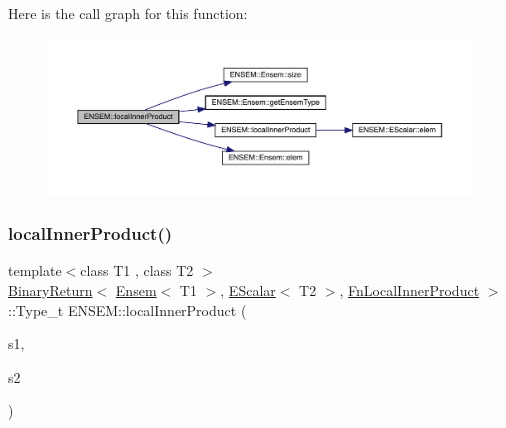 Here is the call graph for this function\+:\nopagebreak
\begin{figure}[H]
\begin{center}
\leavevmode
\includegraphics[width=350pt]{d1/d9e/group__eensem_ga5f487a5a9eb850aeb6bbd0375d54615c_cgraph}
\end{center}
\end{figure}
\mbox{\label{group__eensem_gabc088ed28b376f4b542a0fcd1337b609}} 
\subsubsection{\texorpdfstring{localInnerProduct()}{localInnerProduct()}\hspace{0.1cm}{\footnotesize\ttfamily [2/3]}}
{\footnotesize\ttfamily template$<$class T1 , class T2 $>$ \\
\mbox{\hyperlink{structENSEM_1_1BinaryReturn}{Binary\+Return}}$<$ \mbox{\hyperlink{classENSEM_1_1Ensem}{Ensem}}$<$ T1 $>$, \mbox{\hyperlink{classENSEM_1_1EScalar}{E\+Scalar}}$<$ T2 $>$, \mbox{\hyperlink{structENSEM_1_1FnLocalInnerProduct}{Fn\+Local\+Inner\+Product}} $>$\+::Type\+\_\+t E\+N\+S\+E\+M\+::local\+Inner\+Product (\begin{DoxyParamCaption}\item[{const \mbox{\hyperlink{classENSEM_1_1Ensem}{Ensem}}$<$ T1 $>$ \&}]{s1,  }\item[{const \mbox{\hyperlink{classENSEM_1_1EScalar}{E\+Scalar}}$<$ T2 $>$ \&}]{s2 }\end{DoxyParamCaption})\hspace{0.3cm}{\ttfamily [inline]}}

